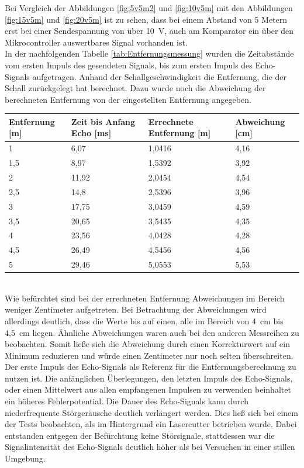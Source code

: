 Bei Vergleich der Abbildungen \ref{fig:5v5m2} und \ref{fig:10v5m} mit den Abbildungen \ref{fig:15v5m} und \ref{fig:20v5m}  ist zu sehen, dass bei einem Abstand von 5 Metern erst bei einer Sendespannung von über 10~V, auch am Komparator ein über den Mikrocontroller auswertbares Signal vorhanden ist. \\
In der nachfolgenden Tabelle \ref{tab:Entfernungsmessung} wurden die Zeitabstände vom ersten Impuls des gesendeten Signals, bis zum ersten Impuls des Echo-Signals aufgetragen. Anhand der Schallgeschwindigkeit die Entfernung, die der Schall zurückgelegt hat berechnet. Dazu wurde noch die Abweichung der berechneten Entfernung von der eingestellten Entfernung angegeben.\\


\begin{minipage}{1\textwidth}
\begin{tabularx}{\textwidth}{|p{}|p{}|p{}|X|}
\hline
Entfernung [m]& Zeit bis Anfang Echo [ms]  & Errechnete Entfernung [m] & Abweichung [cm]\\
\hline
1 & 6,07 & 1,0416 & 4,16\\
\hline
1,5 & 8,97 & 1,5392 & 3,92\\
\hline
2 & 11,92 & 2,0454 & 4,54\\
\hline
2,5 & 14,8 & 2,5396 & 3,96\\
\hline
3 & 17,75 & 3,0459 & 4,59\\
\hline
3,5 & 20,65 & 3,5435 & 4,35\\
\hline
4 & 23,56 & 4,0428 & 4,28\\
\hline
4,5 & 26,49 & 4,5456 & 4,56\\
\hline
5 & 29,46 & 5,0553 & 5,53\\
\hline
\end{tabularx}
\label{tab:Entfernungsmessung}
\end{minipage}\\
Wie befürchtet sind bei der errechneten Entfernung Abweichungen im Bereich weniger Zentimeter aufgetreten. Bei Betrachtung der Abweichungen wird allerdings deutlich, dass die Werte bis auf einen, alle im Bereich von 4~cm bis 4,5~cm liegen. Ähnliche Abweichungen waren auch bei den anderen Messreihen zu beobachten. Somit ließe sich die Abweichung durch einen Korrekturwert auf ein Minimum reduzieren und würde einen Zentimeter nur noch selten überschreiten. Der erste Impuls des Echo-Signals als Referenz für die Entfernungsberechnung zu nutzen ist. Die anfänglichen Überlegungen, den letzten Impuls des Echo-Signals, oder einen Mittelwert aus allen empfangenen Impulsen zu verwenden beinhaltet ein höheres Fehlerpotential. Die Dauer des Echo-Signals kann durch niederfrequente Störgeräusche deutlich verlängert werden. Dies ließ sich bei einem der Tests beobachten, als im Hintergrund ein Lasercutter betrieben wurde. Dabei entstanden entgegen der Befürchtung keine Störsignale, stattdessen war die Signalintensität des Echo-Signals deutlich höher als bei Versuchen in einer stillen Umgebung. 





